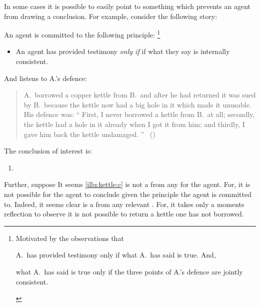 \begin{note}
  In some cases it is possible to easily point to something which prevents an agent from drawing a conclusion.
  For example, consider the following story:

  \begin{scenario}%
    \label{illu:kettle}%
    An agent is committed to the following principle:%
  \footnote{
    Motivated by the observations that
    \begin{enumerate*}[label=(\alph*), ref=(\alph*)]
    \item A.\ has provided testimony only if what A.\ has said is true.
      And,
    \item what A.\ has said is true only if the three points of A.'s defence are jointly consistent.
    \end{enumerate*}
  }
  \begin{itemize}
  \item
    An agent has provided testimony \emph{only if} if what they say is internally consistent.
  \end{itemize}
  And listens to A.'s defence:
    \begin{quote}
      A.\ borrowed a copper kettle from B.\ and after he had returned it was sued by B.\ because the kettle now had a big hole in it which made it unusable. His defence was: ``%
      First, I never borrowed a kettle from B.\ at all; secondly, the kettle had a hole in it already when I got it from him; and thirdly, I gave him back the kettle undamaged.%
      ''%
      \mbox{ }\hfill\mbox{(\cite[62]{Freud:1960wx})}
    \end{quote}
    \vspace{-\baselineskip}
  \end{scenario}

  \noindent%
  The conclusion of interest is:
  \begin{enumerate}[label=C\thescenarioCounter., ref=C\thescenarioCounter]
  \item
    \label{illu:kettle:c}
  \end{enumerate}
  Further, suppose 
  It seems \ref{illu:kettle:c} is not a \fc{} from any \pool{} for the agent.
  For, it is not possible for the agent to conclude  given the principle the agent is committed to.
  Indeed, it seems clear  is a \fc{} from any relevant \pool{}.
  For, it takes only a moments reflection to observe it is not possible to return a kettle one has not borrowed.
\end{note}

